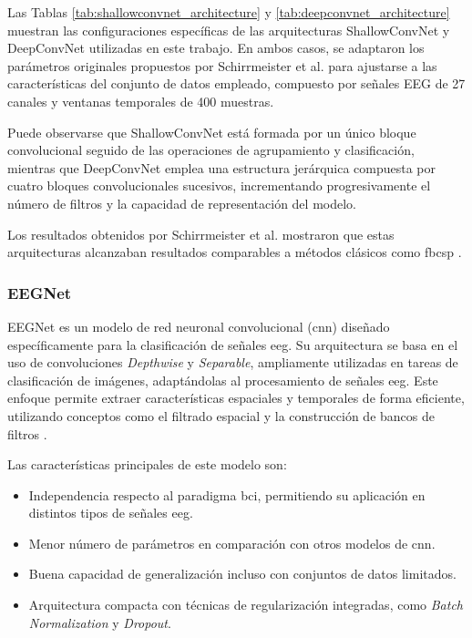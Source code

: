 Las Tablas \ref{tab:shallowconvnet_architecture} y
\ref{tab:deepconvnet_architecture} muestran las configuraciones específicas de las arquitecturas ShallowConvNet y DeepConvNet utilizadas en este trabajo. En ambos casos, se adaptaron los parámetros originales propuestos por Schirrmeister et al. \cite{schirrmeister_DeepLearning2017} para ajustarse a las características del conjunto de datos empleado, compuesto por señales EEG de 27 canales y ventanas temporales de 400 muestras.

Puede observarse que ShallowConvNet está formada por un único bloque convolucional seguido de las operaciones de agrupamiento y clasificación, mientras que DeepConvNet emplea una estructura jerárquica compuesta por cuatro bloques convolucionales sucesivos, incrementando progresivamente el número de filtros y la capacidad de representación del modelo.

Los resultados obtenidos por Schirrmeister et al. mostraron que estas arquitecturas alcanzaban resultados comparables a métodos clásicos como \acrfull{fbcsp} \cite{schirrmeister_DeepLearning2017, edelman_NonInvasiveBrainComputer2025}.


\subsubsection{EEGNet}

EEGNet es un modelo de red neuronal convolucional (\acrshort{cnn}) diseñado específicamente para la clasificación de señales \acrshort{eeg}. Su arquitectura se basa en el uso de convoluciones \textit{Depthwise} y \textit{Separable}, ampliamente utilizadas en tareas de clasificación de imágenes, adaptándolas al procesamiento de señales \acrshort{eeg}. Este enfoque permite extraer características espaciales y temporales de forma eficiente, utilizando conceptos como el filtrado espacial y la construcción de bancos de filtros \cite{lawhern_EEGNetCompact2018}.

Las características principales de este modelo son:

\begin{itemize}
    \item Independencia respecto al paradigma \acrshort{bci}, permitiendo su aplicación en distintos tipos de señales \acrshort{eeg}.
    \item Menor número de parámetros en comparación con otros modelos de \acrshort{cnn}.
    \item Buena capacidad de generalización incluso con conjuntos de datos limitados.
    \item Arquitectura compacta con técnicas de regularización integradas, como \textit{Batch Normalization} y \textit{Dropout}.
\end{itemize}

